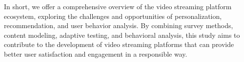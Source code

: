 In short, we offer a comprehensive overview of the video streaming platform ecosystem, exploring the challenges and opportunities of personalization, recommendation, and user behavior analysis. By combining survey methods, content modeling, adaptive testing, and behavioral analysis, this study aims to contribute to the development of video streaming platforms that can provide better user satisfaction and engagement in a responsible way.









